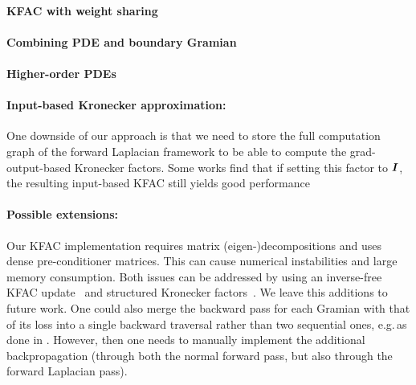 \paragraph{KFAC with weight sharing}

\paragraph{Combining PDE and boundary Gramian}

\paragraph{Higher-order PDEs}

\paragraph{Input-based Kronecker approximation:} One downside of our approach is that we need to store the full computation graph of the forward Laplacian framework to be able to compute the grad-output-based Kronecker factors.
Some works find that if setting this factor to ${\bm{I}}$, the resulting input-based KFAC still yields good performance~\cite{benzing2022gradient,petersen2023isaac}

\paragraph{Possible extensions:} Our KFAC implementation requires matrix (eigen-)decompositions and uses dense pre-conditioner matrices.
This can cause numerical instabilities and large memory consumption.
Both issues can be addressed by using an inverse-free KFAC update~\cite{lin2023simplifying} and structured Kronecker factors~\cite{lin2023structured}.
We leave this additions to future work.
One could also merge the backward pass for each Gramian with that of its loss into a single backward traversal rather than two sequential ones, e.g.\,as done in \cite{dangel2020backpack}.
However, then one needs to manually implement the additional backpropagation (through both the normal forward pass, but also through the forward Laplacian pass).



